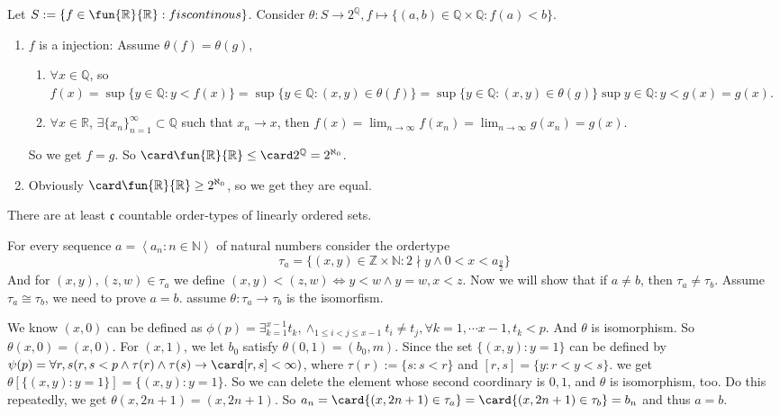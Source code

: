 \documentclass{ctexart}
\begin{document}
\begin{solution}
  Let \(S:=\{f \in \fun{\mathbb{R}}{\mathbb{R}}: f is continous\}\).
  Consider \(\theta: S \to 2^{\mathbb{Q}}, f \mapsto \{(a,b) \in \mathbb{Q} \times \mathbb{Q}: f(a) < b\}\). 
  \begin{enumerate}
    \item \(f\) is a injection: Assume \(\theta(f)=\theta(g)\),
      \begin{enumerate}
        \item \(\forall x\in \mathbb{Q}\), so
          \(f(x)=\sup \{y \in \mathbb{Q}:y<f(x)\}=\sup\{y \in \mathbb{Q}:(x,y) \in \theta(f)\}
          =\sup\{y \in \mathbb{Q} : (x,y) \in \theta (g)\}\sup {y \in \mathbb{Q}: y < g(x)} =g(x)\).
        \item \(\forall x \in \mathbb{R}\), \(\exists \{x_n\}_{n=1}^{\infty} \subset \mathbb{Q}\) 
          such that \(x_n \to x\), then \(f(x)= \lim_{n \to \infty }f(x_n)=\lim_{n \to \infty }g(x_n)=g(x)\). 
      \end{enumerate}
      So we get \(f=g\). So \(\card \fun{\mathbb{R}}{\mathbb{R}} \leq \card 2^{\mathbb{Q}}=2^{\aleph_0}\).
     
    \item Obviously \(\card\fun{\mathbb{R}}{\mathbb{R}} \geq 2^{\aleph_0}\), so we get they are equal. 
  \end{enumerate}
\end{solution}


\begin{problem}
There are at least $\mathfrak{c}$ countable order-types of linearly ordered sets.
\end{problem}

\begin{solution}
For every sequence $a=\left\langle a_n: n \in \mathbb{N}\right\rangle$ of natural numbers consider the ordertype
$$
\tau_a=\{(x,y) \in \mathbb{Z}\times \mathbb{N}:2 \nmid y \wedge 0<x<a_{\frac{y}{2}}\}
$$
And for \((x,y),(z,w) \in \tau_a\) we define \((x,y)<(z,w) \iff y<w \wedge y=w,x<z\).
Now we will show that if $a \neq b$, then $\tau_a \neq \tau_b$. 
Assume \(\tau_a \cong \tau_b\), we need to prove \(a=b\). assume \(\theta:\tau_a \to \tau_b\) is the isomorfism. 

We know \((x,0)\) can be defined as \(\phi(p)=\exists_{k=1}^{x-1} t_k,\wedge_{1 \leq i < j \leq x-1}t_i \neq t_j, \forall k=1,\cdots x-1, t_k<p\). 
And \(\theta\) is isomorphism. So \(\theta(x,0)=(x,0)\). 
For \((x,1)\), we let \(b_0\) satisfy \(\theta(0,1)=(b_0,m)\). 
Since the set \(\{(x,y):y=1\}\) can be defined by \(\psi(p)=\forall r,s(r,s<p \wedge \tau(r)\wedge \tau(s) \to \card[r,s] < \infty )\), 
where \(\tau(r):= \{s:s<r\}\) and \([r,s]=\{y:r<y<s\}\). 
we get \(\theta[\{(x,y):y=1\}]=\{(x,y):y=1\}\). 
So we can delete the element whose second coordinary is \(0,1\), and \(\theta\) is isomorphism, too. 
Do this repeatedly, we get \(\theta(x,2n+1)=(x,2n+1)\). 
So \(a_n=\card\{(x,2n+1)\in \tau_a\}=\card \{(x,2n+1) \in \tau_b\}=b_n\) and thus \(a=b\).
\end{solution}
\end{document}

